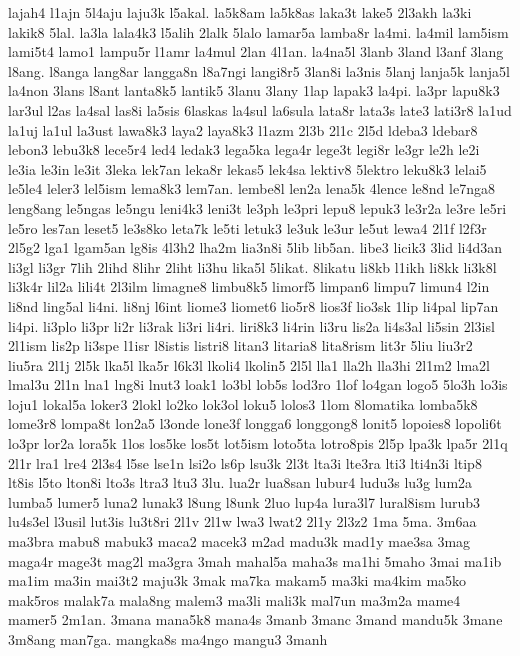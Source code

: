 {lajah4 l1ajn 5l4aju laju3k l5akal. la5k8am la5k8as laka3t lake5 2l3akh
la3ki lakik8 5lal. la3la lala4k3 l5alih 2lalk 5lalo lamar5a lamba8r la4mi.
la4mil lam5ism lami5t4 lamo1 lampu5r l1amr la4mul 2lan 4l1an. la4na5l
3lanb 3land l3anf 3lang l8ang. l8anga lang8ar langga8n l8a7ngi langi8r5
3lan8i la3nis 5lanj lanja5k lanja5l la4non 3lans l8ant lanta8k5 lantik5
3lanu 3lany 1lap lapak3 la4pi. la3pr lapu8k3 lar3ul l2as la4sal las8i
la5sis 6laskas la4sul la6sula lata8r lata3s late3 lati3r8 la1ud la1uj
la1ul la3ust lawa8k3 laya2 laya8k3 l1azm 2l3b 2l1c 2l5d ldeba3 ldebar8
lebon3 lebu3k8 lece5r4 led4 ledak3 lega5ka lega4r lege3t legi8r le3gr le2h
le2i le3ia le3in le3it 3leka lek7an leka8r lekas5 lek4sa lektiv8 5lektro
leku8k3 lelai5 le5le4 leler3 lel5ism lema8k3 lem7an. lembe8l len2a lena5k
4lence le8nd le7nga8 leng8ang le5ngas le5ngu leni4k3 leni3t le3ph le3pri
lepu8 lepuk3 le3r2a le3re le5ri le5ro les7an leset5 le3s8ko leta7k le5ti
letuk3 le3uk le3ur le5ut lewa4 2l1f l2f3r 2l5g2 lga1 lgam5an lg8is 4l3h2
lha2m lia3n8i 5lib lib5an. libe3 licik3 3lid li4d3an li3gl li3gr 7lih
2lihd 8lihr 2liht li3hu lika5l 5likat. 8likatu li8kb l1ikh li8kk li3k8l
li3k4r lil2a lili4t 2l3ilm limagne8 limbu8k5 limorf5 limpan6 limpu7 limun4
l2in li8nd ling5al li4ni. li8nj l6int liome3 liomet6 lio5r8 lios3f lio3sk
1lip li4pal lip7an li4pi. li3plo li3pr li2r li3rak li3ri li4ri. liri8k3
li4rin li3ru lis2a li4s3al li5sin 2l3isl 2l1ism lis2p li3spe l1isr l8istis
listri8 litan3 litaria8 lita8rism lit3r 5liu liu3r2 liu5ra 2l1j 2l5k lka5l
lka5r l6k3l lkoli4 lkolin5 2l5l lla1 lla2h lla3hi 2l1m2 lma2l lmal3u 2l1n
lna1 lng8i lnut3 loak1 lo3bl lob5s lod3ro 1lof lo4gan logo5 5lo3h lo3is
loju1 lokal5a loker3 2lokl lo2ko lok3ol loku5 lolos3 1lom 8lomatika
lomba5k8 lome3r8 lompa8t lon2a5 l3onde lone3f longga6 longgong8 lonit5
lopoies8 lopoli6t lo3pr lor2a lora5k 1los los5ke los5t lot5ism loto5ta
lotro8pis 2l5p lpa3k lpa5r 2l1q 2l1r lra1 lre4 2l3s4 l5se lse1n lsi2o ls6p
lsu3k 2l3t lta3i lte3ra lti3 lti4n3i ltip8 lt8is l5to lton8i lto3s ltra3
ltu3 3lu. lua2r lua8san lubur4 ludu3s lu3g lum2a lumba5 lumer5 luna2
lunak3 l8ung l8unk 2luo lup4a lura3l7 lural8ism lurub3 lu4s3el l3usil
lut3is lu3t8ri 2l1v 2l1w lwa3 lwat2 2l1y 2l3z2 1ma 5ma. 3m6aa ma3bra mabu8
mabuk3 maca2 macek3 m2ad madu3k mad1y mae3sa 3mag maga4r mage3t mag2l
ma3gra 3mah mahal5a maha3s ma1hi 5maho 3mai ma1ib ma1im ma3in mai3t2
maju3k 3mak ma7ka makam5 ma3ki ma4kim ma5ko mak5ros malak7a mala8ng malem3
ma3li mali3k mal7un ma3m2a mame4 mamer5 2m1an. 3mana mana5k8 mana4s 3manb
3manc 3mand mandu5k 3mane 3m8ang man7ga. mangka8s ma4ngo mangu3 3manh
}
